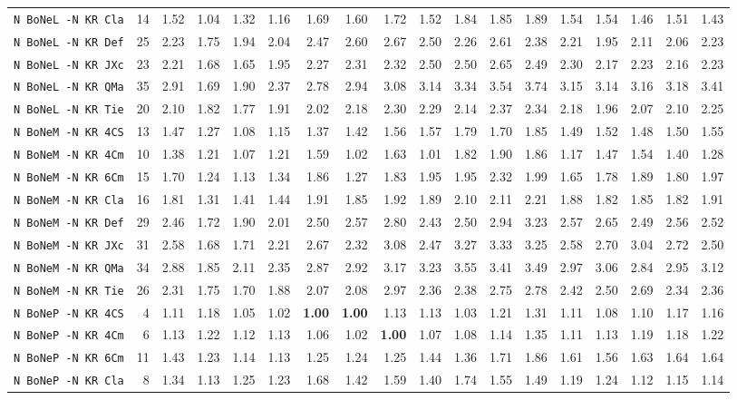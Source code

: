 \begin{tabular}{l | r r | r r r r r r r r r r r r r r r |}
\verb+N BoNeL -N KR Cla+ & 14 & 1.52 & 1.04&1.32&1.16&1.69&1.60&1.72&1.52&1.84&1.85&1.89&1.54&1.54&1.46&1.51&1.43\\
\verb+N BoNeL -N KR Def+ & 25 & 2.23 & 1.75&1.94&2.04&2.47&2.60&2.67&2.50&2.26&2.61&2.38&2.21&1.95&2.11&2.06&2.23\\
\verb+N BoNeL -N KR JXc+ & 23 & 2.21 & 1.68&1.65&1.95&2.27&2.31&2.32&2.50&2.50&2.65&2.49&2.30&2.17&2.23&2.16&2.23\\
\verb+N BoNeL -N KR QMa+ & 35 & 2.91 & 1.69&1.90&2.37&2.78&2.94&3.08&3.14&3.34&3.54&3.74&3.15&3.14&3.16&3.18&3.41\\
\verb+N BoNeL -N KR Tie+ & 20 & 2.10 & 1.82&1.77&1.91&2.02&2.18&2.30&2.29&2.14&2.37&2.34&2.18&1.96&2.07&2.10&2.25\\
\verb+N BoNeM -N KR 4CS+ & 13 & 1.47 & 1.27&1.08&1.15&1.37&1.42&1.56&1.57&1.79&1.70&1.85&1.49&1.52&1.48&1.50&1.55\\
\verb+N BoNeM -N KR 4Cm+ & 10 & 1.38 & 1.21&1.07&1.21&1.59&1.02&1.63&1.01&1.82&1.90&1.86&1.17&1.47&1.54&1.40&1.28\\
\verb+N BoNeM -N KR 6Cm+ & 15 & 1.70 & 1.24&1.13&1.34&1.86&1.27&1.83&1.95&1.95&2.32&1.99&1.65&1.78&1.89&1.80&1.97\\
\verb+N BoNeM -N KR Cla+ & 16 & 1.81 & 1.31&1.41&1.44&1.91&1.85&1.92&1.89&2.10&2.11&2.21&1.88&1.82&1.85&1.82&1.91\\
\verb+N BoNeM -N KR Def+ & 29 & 2.46 & 1.72&1.90&2.01&2.50&2.57&2.80&2.43&2.50&2.94&3.23&2.57&2.65&2.49&2.56&2.52\\
\verb+N BoNeM -N KR JXc+ & 31 & 2.58 & 1.68&1.71&2.21&2.67&2.32&3.08&2.47&3.27&3.33&3.25&2.58&2.70&3.04&2.72&2.50\\
\verb+N BoNeM -N KR QMa+ & 34 & 2.88 & 1.85&2.11&2.35&2.87&2.92&3.17&3.23&3.55&3.41&3.49&2.97&3.06&2.84&2.95&3.12\\
\verb+N BoNeM -N KR Tie+ & 26 & 2.31 & 1.75&1.70&1.88&2.07&2.08&2.97&2.36&2.38&2.75&2.78&2.42&2.50&2.69&2.34&2.36\\
\verb+N BoNeP -N KR 4CS+ & 4 & 1.11 & 1.18&1.05&1.02&\textbf{1.00}&\textbf{1.00}&1.13&1.13&1.03&1.21&1.31&1.11&1.08&1.10&1.17&1.16\\
\verb+N BoNeP -N KR 4Cm+ & 6 & 1.13 & 1.22&1.12&1.13&1.06&1.02&\textbf{1.00}&1.07&1.08&1.14&1.35&1.11&1.13&1.19&1.18&1.22\\
\verb+N BoNeP -N KR 6Cm+ & 11 & 1.43 & 1.23&1.14&1.13&1.25&1.24&1.25&1.44&1.36&1.71&1.86&1.61&1.56&1.63&1.64&1.64\\
\verb+N BoNeP -N KR Cla+ & 8 & 1.34 & 1.13&1.25&1.23&1.68&1.42&1.59&1.40&1.74&1.55&1.49&1.19&1.24&1.12&1.15&1.14\\

\end{tabular}
